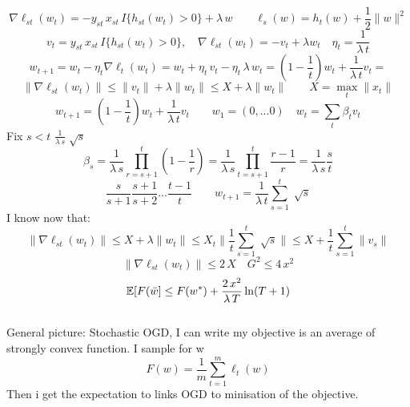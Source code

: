 \documentclass[../main.tex]{subfiles}
\begin{document}
$$
\nabla \ell_{st}(w_t) = - y_{st} \, x_{st} \, I\{ h_{st}(w_t) >0\} + \lambda \, w\qquad \ell_s(w) = h_t(w) + \frac{1}{2} \|w\|^2
$$
$$
v_t = y_{st} \, x_{st} \, I \{ h_{st} (w_t) >0 \}, \quad \nabla \ell_{st}(w_t) = - v_t + \lambda w_t \quad \eta_t = \frac{1}{\lambda \, t}
$$
$$
w_{t+1} = w_t - \eta_t \nabla \ell_t(w_t) = w_t+ \eta_t \, v_t -\eta_t \, \lambda \, w_t = \left(1- \frac{1}{t} \right) w_t + \frac{1}{\lambda \, t} v_t=
$$ 
$$
\|\nabla \ell_{st}(w_t) \| \leq \| v_t \| + \lambda \| w_t \| \leq X + \lambda \|w_t\| \qquad X = \max_t \| x_t\|
$$
$$
w_{t+1} = \left( 1- \frac{1}{t} \right) w_t + \frac{1}{\lambda \, t} v_t \qquad w_1 = (0,...0) \quad w_t = \sum_t \beta_t v_t
$$
Fix $s <t$ \quad $\frac{1}{\lambda \, s} \sqrt[]{s} $
$$
\beta_s = \frac{1}{\lambda \, s} \prod^t_{r = s+1} \left( 1- \frac{1}{r} \right) = \frac{1}{\lambda \, s} \prod_{t = s+1}^t \frac{r-1}{r} = \frac{1}{\lambda \,  s} \frac{s}{t}
$$
$$
\frac{s}{s+1} \frac{s+1}{s+2}... \frac{t-1}{t} \qquad w_{t+1} = \frac{1}{\lambda \, t} \sum_{s=1}^t \sqrt[]{s}
$$
I know now that:
$$
\| \nabla \ell_{st}(w_t) \| \leq X + \lambda \|w_t \| \leq X_t \| \frac{1}{t} \sum_{s=1}^t \sqrt[]{s}\| \leq X + \frac{1}{t} \sum_{s=1}^t \| v_s \|
$$
$$
\| \nabla \ell_{st} (w_t) \| \leq 2 \, X \quad G^2 \leq 4\, x^2
$$
$$
\mathbb{E} [ F(\bar{w}] \leq F(w^*) + \frac{2 \, x^2}{\lambda \, T} \ln (T+1)
$$\\
General picture: Stochastic OGD, I can write my objective is an average of strongly  convex function. I sample for w
$$
F(w) = \frac{1}{m} \sum_{t=1}^m \ell_t(w)
$$
Then i get the expectation to links OGD to minisation of the objective.
\end{document}
